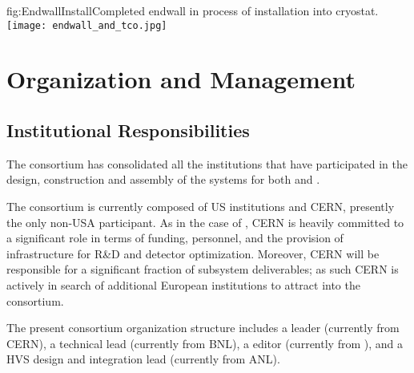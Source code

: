 \begin{dunefigure}{fig:EndwallInstall}{Completed endwall in process of installation into  cryostat.}
\texttt{[image: endwall\_and\_tco.jpg]}
\end{dunefigure}


\clearpage
\section{Organization and Management}
\label{sec:fdsp-hv-org}


\subsection{Institutional Responsibilities}
\label{sec:fdsp-hv-org-consortium}
The consortium has consolidated all the institutions that have participated in the design, construction and assembly of the  systems for both   and . 

The consortium is currently composed of US institutions and CERN, presently the only non-USA participant. As in the case of , CERN is heavily committed to a significant role in terms of funding, personnel, 
 and the provision of infrastructure for R\&D and detector optimization. Moreover, CERN will be responsible for a significant fraction of subsystem deliverables; as such  CERN is actively in search of additional European institutions to attract into the consortium. 
 
 The present consortium organization structure includes a leader (currently from CERN), a technical lead (currently from BNL), a  editor (currently from \fnal), and a HVS design and integration lead (currently from ANL). 

